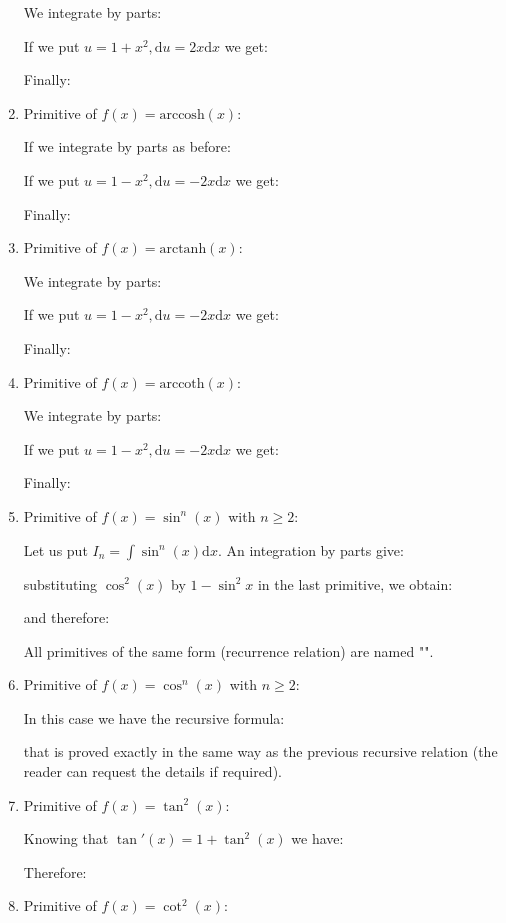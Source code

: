 \begin{enumerate}
		We integrate by parts:
		
		If we put $u=1+x^2,\mathrm{d}u=2x\mathrm{d}x$ we get:
		
		Finally:
		
		\item Primitive of $f(x)=\text{arccosh}(x)$:
		
		If we integrate by parts as before:
		
		If we put $u=1-x^2,\mathrm{d}u=-2x\mathrm{d}x$ we get:
		
		Finally:
		
		\item Primitive of $f(x)=\text{arctanh}(x)$:
		
		We integrate by parts:
		
		If we put $u=1-x^2,\mathrm{d}u=-2x\mathrm{d}x$ we get:
		
		Finally:
		
		\item Primitive of $f(x)=\text{arccoth}(x)$:
		
		We integrate by parts:
		
		If we put $u=1-x^2,\mathrm{d}u=-2x\mathrm{d}x$ we get:
		
		Finally:
		
		\item Primitive of $f(x)=\sin ^{n}(x)$ with $n \geq 2$:
		
		Let us put $I_n=\int \sin ^n(x)\mathrm{d}x$. An integration by parts give:
		
		substituting $\cos ^2(x)$ by $1-\sin ^2{x}$ in the last primitive, we obtain:
		
		and therefore:
		
		All primitives of the same form (recurrence relation) are named "".
		
		\item Primitive of $f(x)=\cos ^{n}(x)$ with $n \geq 2$:
		
		In this case we have the recursive formula:
		
		that is proved exactly in the same way as the previous recursive relation (the reader can request the details if required).
		\item Primitive of $f(x)=\tan ^{2}(x)$:
		
		Knowing that $\tan'(x)=1+\tan^2(x)$ we have:
		
		Therefore:
		
		\item Primitive of $f(x)=\cot ^{2}(x)$:
		

\end{enumerate}
